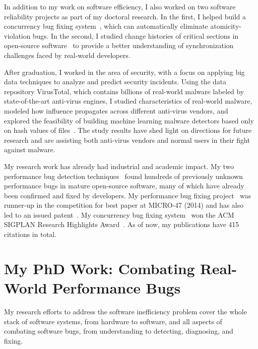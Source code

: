\documentclass[10pt]{article}
\begin{document}
In addition to my work on software efficiency, I also worked on two software reliability projects as part of my doctoral research. In the first, 
I helped build a concurrency bug fixing system~\cite{jin11afix}, 
which can automatically eliminate atomicity-violation bugs.
In the second, I studied change histories of critical sections in open-source software~\cite{Gu15FSE} 
to provide a better understanding of synchronization challenges faced by real-world developers. 

After graduation, I worked in the area of security, 
with a focus on applying big data techniques to analyze and predict security incidents. 
Using the data repository VirusTotal, 
which contains billions of real-world malware labeled by state-of-the-art anti-virus engines, 
I studied characteristics of real-world malware, 
modeled how influence propagates across different anti-virus vendors, 
and explored the feasibility of building machine learning malware detectors based only on hash values of files~\cite{Song16ApSys,Song17EuroSys}. 
The study results have shed light on directions for future research  
and are assisting both anti-virus vendors and normal users in their fight against malware.

My research work has already had industrial and academic impact. 
My two performance bug detection techniques~\cite{jin12perfbug, Nistor13ICSE} 
found hundreds of previously unknown performance bugs in mature open-source software, 
many of which have already been confirmed and fixed by developers. 
My performance bug fixing project~\cite{Song14MICRO} was runner-up in the competition for best paper at MICRO-47 (2014)
and has also led to an issued patent~\cite{comppatent}.
My concurrency bug fixing system~\cite{jin11afix} won the ACM SIGPLAN Research Highlights Award~\cite{afixnom}. 
As of now, my publications have 415 citations in total. 

\vspace{-.1in}
\section{My PhD Work: Combating Real-World Performance Bugs}

My research efforts to address the software inefficiency problem cover the whole stack of software systems, from hardware to software, 
and all aspects of combating software bugs, from understanding to detecting, diagnosing, and fixing. 

\vspace{-.1in}
\end{document}
